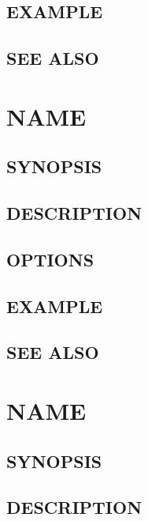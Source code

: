 \documentclass[letterpaper,10pt,english]{manual}
\begin{document}
\section{EXAMPLE}


\section{SEE ALSO}

\resetcurrentobjects
\hypertarget{--doc-xscore-check}{}

\chapter{NAME}


\section{SYNOPSIS}


\section{DESCRIPTION}


\section{OPTIONS}


\section{EXAMPLE}


\section{SEE ALSO}

\resetcurrentobjects
\hypertarget{--doc-xscore-new}{}

\chapter{NAME}


\section{SYNOPSIS}


\section{DESCRIPTION}
\end{document}
